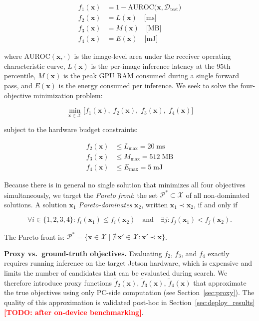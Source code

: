 \documentclass[journal]{IEEEtran}
\newcommand{\TODO}[1]{\textcolor{red}{\textbf{[TODO: #1]}}}
\newcommand{\calX}{\mathcal{X}}
\begin{document}
\begin{align}
f_1(\bm{x}) &= 1 - \mathrm{AUROC}\bigl(\bm{x}, \mathcal{D}_{\mathrm{test}}\bigr)
  \label{eq:obj1} \\
f_2(\bm{x}) &= L(\bm{x})   \quad \text{[ms]}  \label{eq:obj2} \\
f_3(\bm{x}) &= M(\bm{x})   \quad \text{[MB]}  \label{eq:obj3} \\
f_4(\bm{x}) &= E(\bm{x})   \quad \text{[mJ]}  \label{eq:obj4}
\end{align}

where $\mathrm{AUROC}(\bm{x}, \cdot)$ is the image-level area under the
receiver operating characteristic curve, $L(\bm{x})$ is the per-image
inference latency at the 95th percentile, $M(\bm{x})$ is the peak GPU RAM
consumed during a single forward pass, and $E(\bm{x})$ is the energy consumed
per inference.
We seek to solve the four-objective minimization problem:

\begin{equation}
\min_{\bm{x} \in \calX}
\bigl[ f_1(\bm{x}),\; f_2(\bm{x}),\; f_3(\bm{x}),\; f_4(\bm{x}) \bigr]
\label{eq:mop}
\end{equation}

subject to the hardware budget constraints:

\begin{align}
f_2(\bm{x}) &\leq L_{\max} = 20\;\text{ms}  \label{eq:c1} \\
f_3(\bm{x}) &\leq M_{\max} = 512\;\text{MB} \label{eq:c2} \\
f_4(\bm{x}) &\leq E_{\max} = 5\;\text{mJ}   \label{eq:c3}
\end{align}

\noindent
Because there is in general no single solution that minimizes all four
objectives simultaneously, we target the \emph{Pareto front}: the set
$\mathcal{P}^* \subset \calX$ of all non-dominated solutions.
A solution $\bm{x}_1$ \textit{Pareto-dominates} $\bm{x}_2$, written
$\bm{x}_1 \prec \bm{x}_2$, if and only if

\begin{equation}
\forall i \in \{1,2,3,4\}: f_i(\bm{x}_1) \leq f_i(\bm{x}_2)
\quad\text{and}\quad
\exists j: f_j(\bm{x}_1) < f_j(\bm{x}_2).
\label{eq:dominance}
\end{equation}

\noindent
The Pareto front is:
$\mathcal{P}^* = \{\bm{x} \in \calX \mid \nexists\, \bm{x}' \in \calX : \bm{x}' \prec \bm{x}\}$.

\medskip
\noindent\textbf{Proxy vs.\ ground-truth objectives.}
Evaluating $f_2$, $f_3$, and $f_4$ exactly requires running inference on the
target Jetson hardware, which is expensive and limits the number of candidates
that can be evaluated during search.
We therefore introduce proxy functions
$\tilde{f}_2(\bm{x})$, $\tilde{f}_3(\bm{x})$, $\tilde{f}_4(\bm{x})$
that approximate the true objectives using only PC-side computation
(see Section~\ref{sec:proxy}).
The quality of this approximation is validated post-hoc in
Section~\ref{sec:deploy_results} \TODO{after on-device benchmarking}.
\end{document}
